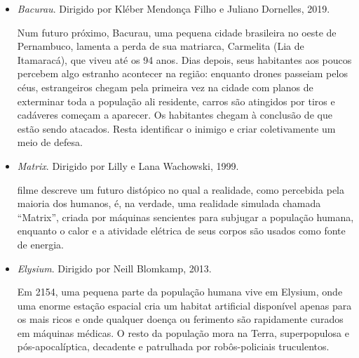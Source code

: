 \documentclass[11pt]{extarticle}
\begin{document}
\begin{itemize}
\item \textit{Bacurau}. Dirigido por Kléber Mendonça Filho e Juliano Dornelles, 2019.

Num futuro próximo, Bacurau, uma pequena cidade brasileira no oeste de Pernambuco, lamenta a perda de sua matriarca, Carmelita (Lia de Itamaracá), que viveu até os 94 anos. Dias depois, seus habitantes aos poucos percebem algo estranho acontecer na região: enquanto drones passeiam pelos céus, estrangeiros chegam pela primeira vez na cidade com planos de exterminar toda a população ali residente, carros são atingidos por tiros e cadáveres começam a aparecer. Os habitantes chegam à conclusão de que estão sendo atacados. Resta identificar o inimigo e criar coletivamente um meio de defesa.

\item \textit{Matrix}. Dirigido por Lilly e Lana Wachowski, 1999. 

 filme descreve um futuro distópico no qual a realidade, como percebida pela maioria dos humanos, é, na verdade, uma realidade simulada chamada ``Matrix'', criada por máquinas sencientes para subjugar a população humana, enquanto o calor e a atividade elétrica de seus corpos são usados ​​como fonte de energia.

\item \textit{Elysium}. Dirigido por Neill Blomkamp, 2013.

Em 2154, uma pequena parte da população humana vive em Elysium, onde uma enorme estação espacial cria um habitat artificial disponível apenas para os mais ricos e onde qualquer doença ou ferimento são rapidamente curados em máquinas médicas. O resto da população mora na Terra, superpopulosa e pós-apocalíptica, decadente e patrulhada por robôs-policiais truculentos.

\end{itemize}
\end{document}
